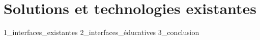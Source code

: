\section{Solutions et technologies existantes}

{1_interfaces_existantes}
{2_interfaces_éducatives}
{3_conclusion}
